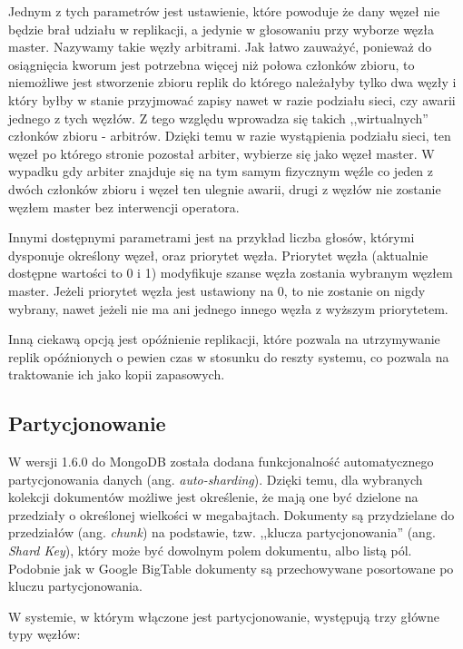 Jednym z tych parametrów jest ustawienie, które powoduje że dany węzeł nie będzie brał udziału w replikacji, a jedynie w głosowaniu przy wyborze węzła master.
Nazywamy takie węzły arbitrami.
Jak łatwo zauważyć, ponieważ do osiągnięcia kworum jest potrzebna więcej niż połowa członków zbioru, to niemożliwe jest stworzenie zbioru replik do którego należałyby tylko dwa węzły i który byłby w stanie przyjmować zapisy nawet w razie podziału sieci, czy awarii jednego z tych węzłów.
Z tego względu wprowadza się takich ,,wirtualnych'' członków zbioru - arbitrów.
Dzięki temu w razie wystąpienia podziału sieci, ten węzeł po którego stronie pozostał arbiter, wybierze się jako węzeł master.
W wypadku gdy arbiter znajduje się na tym samym fizycznym węźle co jeden z dwóch członków zbioru i węzeł ten ulegnie awarii, drugi z węzłów nie zostanie węzłem master bez interwencji operatora.

Innymi dostępnymi parametrami jest na przykład liczba głosów, którymi dysponuje określony węzeł, oraz priorytet węzła.
Priorytet węzła (aktualnie dostępne wartości to 0 i 1) modyfikuje szanse węzła zostania wybranym węzłem master.
Jeżeli priorytet węzła jest ustawiony na 0, to nie zostanie on nigdy wybrany, nawet jeżeli nie ma ani jednego innego węzła z wyższym priorytetem.

Inną ciekawą opcją jest opóźnienie replikacji, które pozwala na utrzymywanie replik opóźnionych o pewien czas w stosunku do reszty systemu, co pozwala na traktowanie ich jako kopii zapasowych.

\subsection*{Partycjonowanie}


W wersji 1.6.0 do MongoDB została dodana funkcjonalność automatycznego partycjonowania danych (ang. \emph{auto-sharding}).
Dzięki temu, dla wybranych kolekcji dokumentów możliwe jest określenie, że mają one być dzielone na przedziały o określonej wielkości w megabajtach.
Dokumenty są przydzielane do przedziałów (ang. \emph{chunk}) na podstawie, tzw. ,,klucza partycjonowania'' (ang. \emph{Shard Key}), który może być dowolnym polem dokumentu, albo listą pól.
Podobnie jak w Google BigTable dokumenty są przechowywane posortowane po kluczu partycjonowania.

W systemie, w którym włączone jest partycjonowanie, występują trzy główne typy węzłów:


